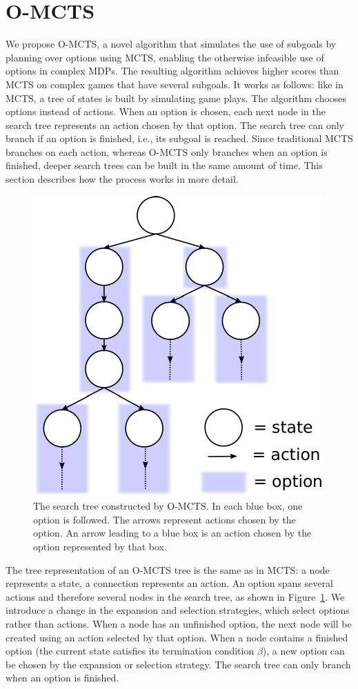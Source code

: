 \section{O-MCTS}
\label{sec:planning}

We propose O-MCTS, a novel algorithm that simulates the use of subgoals by
planning over options using MCTS, enabling the otherwise infeasible use of
options in complex MDPs\@. The resulting algorithm achieves higher scores than
MCTS on complex games that have several subgoals. It works as follows: like in
MCTS, a tree of states is built by simulating game plays. The algorithm chooses
options instead of actions. When an option is chosen, each next node in the
search tree represents an action chosen by that option. The search tree can only
branch if an option is finished, i.e., its subgoal is reached. Since traditional
MCTS branches on each action, whereas O-MCTS only branches when an option is
finished, deeper search trees can be built in the same amount of time.  This
section describes how the process works in more detail.

\begin{figure}
	\centering
	\includegraphics[width=.4\columnwidth]{includes/omcts-eps-converted-to.pdf}
	\caption{The search tree constructed by O-MCTS\@. In each blue box, one
	option is followed. The arrows represent actions chosen by the option. An
	arrow leading to a blue box is an action chosen by the option represented by
	that box.}
\label{fig:omcts-tree}
\end{figure}


The tree representation of an O-MCTS tree is the same as in MCTS\@: a node
represents a state, a connection represents an action. An option spans several
actions and therefore several nodes in the search tree, as shown in
Figure~\ref{fig:omcts-tree}. We introduce a change in the expansion and
selection strategies, which select options rather than actions. When a node has
an unfinished option, the next node will be created using an action selected by
that option. When a node contains a finished option (the current state satisfies
its termination condition $\beta$), a new option can be chosen by the expansion
or selection strategy. The search tree can only branch when an option is
finished.

